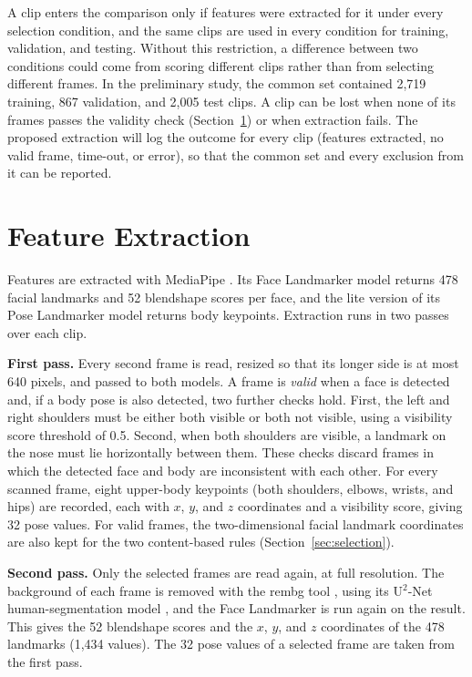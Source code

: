 A clip enters the comparison only if features were extracted for it under every selection condition, and the same clips are used in every condition for training, validation, and testing. Without this restriction, a difference between two conditions could come from scoring different clips rather than from selecting different frames. In the preliminary study, the common set contained 2,719 training, 867 validation, and 2,005 test clips. A clip can be lost when none of its frames passes the validity check (Section~\ref{sec:features}) or when extraction fails. The proposed extraction will log the outcome for every clip (features extracted, no valid frame, time-out, or error), so that the common set and every exclusion from it can be reported.



\section{Feature Extraction}
\label{sec:features}

Features are extracted with MediaPipe \cite{lugaresi2019}. Its Face Landmarker model returns 478 facial landmarks and 52 blendshape scores per face, and the lite version of its Pose Landmarker model returns body keypoints. Extraction runs in two passes over each clip.

\textbf{First pass.} Every second frame is read, resized so that its longer side is at most 640 pixels, and passed to both models. A frame is \emph{valid} when a face is detected and, if a body pose is also detected, two further checks hold. First, the left and right shoulders must be either both visible or both not visible, using a visibility score threshold of 0.5. Second, when both shoulders are visible, a landmark on the nose must lie horizontally between them. These checks discard frames in which the detected face and body are inconsistent with each other. For every scanned frame, eight upper-body keypoints (both shoulders, elbows, wrists, and hips) are recorded, each with $x$, $y$, and $z$ coordinates and a visibility score, giving 32 pose values. For valid frames, the two-dimensional facial landmark coordinates are also kept for the two content-based rules (Section~\ref{sec:selection}).

\textbf{Second pass.} Only the selected frames are read again, at full resolution. The background of each frame is removed with the rembg tool \cite{rembg}, using its U$^2$-Net human-segmentation model \cite{qin2020}, and the Face Landmarker is run again on the result. This gives the 52 blendshape scores and the $x$, $y$, and $z$ coordinates of the 478 landmarks (1,434 values). The 32 pose values of a selected frame are taken from the first pass.

